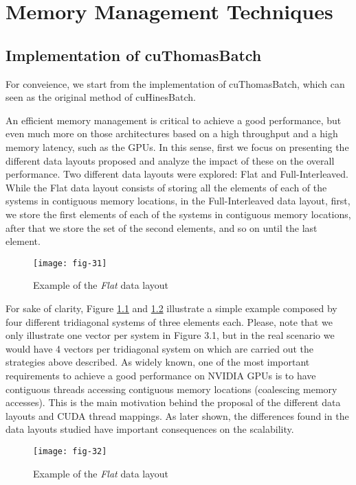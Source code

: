 
\chapter{Memory Management Techniques}

\section{Implementation of cuThomasBatch}
For conveience, we start from the implementation of cuThomasBatch, which can seen as the original method of cuHinesBatch.

An efficient memory management is critical to achieve a good performance, but even
much more on those architectures based on a high throughput and a high memory
latency, such as the GPUs. In this sense, first we focus on presenting the different data
layouts proposed and analyze the impact of these on the overall performance. Two
different data layouts were explored: Flat and Full-Interleaved. While the Flat data
layout consists of storing all the elements of each of the systems in contiguous memory
locations, in the Full-Interleaved data layout, first, we store the first elements of each
of the systems in contiguous memory locations, after that we store the set of the second
elements, and so on until the last element.

\begin{figure}[htbp]
    \centering
    \texttt{[image: fig-31]}
    \caption{Example of the \textit{Flat} data layout}
    \label{fig:fig-31}
\end{figure}

For sake of clarity, Figure \ref{fig:fig-31} and \ref{fig:fig-32} illustrate a simple example composed by four
different tridiagonal systems of three elements each. Please, note that we only illustrate
one vector per system in Figure 3.1, but in the real scenario we would have 4 vectors
per tridiagonal system on which are carried out the strategies above described. As
widely known, one of the most important requirements to achieve a good performance
on NVIDIA GPUs is to have contiguous threads accessing contiguous memory locations
(coalescing memory accesses). This is the main motivation behind the proposal of the
different data layouts and CUDA thread mappings. As later shown, the differences
found in the data layouts studied have important consequences on the scalability.

\begin{figure}[htbp]
    \centering
    \texttt{[image: fig-32]}
    \caption{Example of the \textit{Flat} data layout}
    \label{fig:fig-32}
\end{figure}

